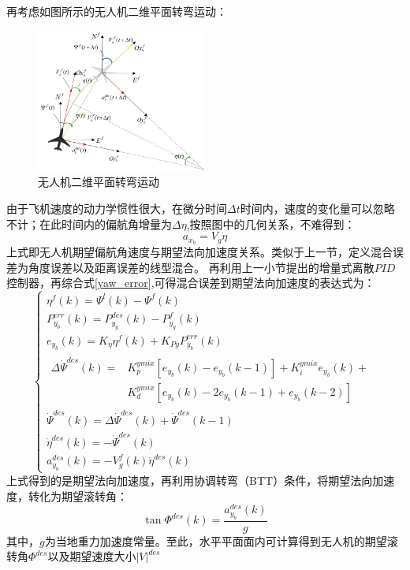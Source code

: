 再考虑如图所示的无人机二维平面转弯运动：
\begin{figure}[H]
    \centering
    \includegraphics[width=0.5\textwidth]{figures/c3/c3-BTT.png}
    \caption{无人机二维平面转弯运动}\label{fig:c3-BTT}
\end{figure}
由于飞机速度的动力学惯性很大，在微分时间$\Delta t$时间内，速度的变化量可以忽略不计；在此时间内的偏航角增量为$\Delta\eta$,按照图中的几何关系，不难得到：
\begin{equation}
    a_{x_b}=V_g\dot{\eta}
    \label{btt_dot}
\end{equation}
上式即无人机期望偏航角速度与期望法向加速度关系。类似于上一节，定义混合误差为角度误差以及距离误差的线型混合。
再利用上一小节提出的增量式离散$PID$控制器，再综合式\ref{yaw_error},可得混合误差到期望法向加速度的表达式为：
\begin{equation}
    \left\{
        \begin{array}{l}
            \eta^f(k)=\Psi^l(k)-\Psi^f(k)\\
            P_{y_b}^{err}(k)=P_{y_g}^{des}(k)-P_{y_g}^{f}(k)\\
            e_{y_b}(k)=K_{\eta}\eta^f(k)+K_{Py}P_{y_b}^{err}(k)\\
                \begin{aligned}
                \Delta\dot{\Psi}^{des}(k)=&K_{p}^{ymix}[e_{y_b}(k)-e_{y_b}(k-1)]+K_{i}^{ymix}e_{y_b}(k)+\\
                &K_{d}^{ymix}[e_{y_b}(k)-2e_{y_b}(k-1)+e_{y_b}(k-2)]
                \end{aligned}\\
            \dot{\Psi}^{des}(k)=\Delta\dot{\Psi}^{des}(k)+\dot{\Psi}^{des}(k-1)\\
            \dot{\eta}^{des}(k)=-\dot{\Psi}^{des}(k)\\
            a_{y_b}^{des}(k)=-V_g^{f}(k)\dot{\eta}^{des}(k)
    \end{array}
\right .
    \label{angle_controller}
\end{equation}
上式得到的是期望法向加速度，再利用协调转弯（BTT）条件，将期望法向加速度，转化为期望滚转角：
\begin{equation}
    \tan\Phi^{des}(k)=\frac{a_{y_b}^{des}(k)}{g}
    \label{btt_a2roll}
\end{equation}
其中，$g$为当地重力加速度常量。至此，水平平面面内可计算得到无人机的期望滚转角$\Phi^{des}$以及期望速度大小$|V|^{des}$
